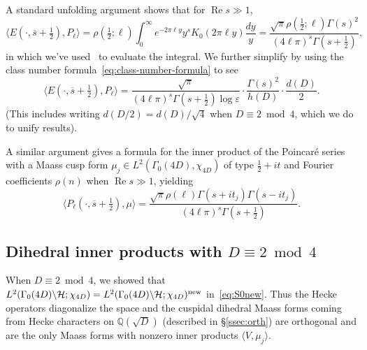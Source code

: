 \documentclass[11pt,reqno,oneside]{amsart}
\theoremstyle{plain}
\theoremstyle{definition}
\renewcommand{\Re}{\operatorname{Re}}
\newcommand{\chid}{\chi_{4D}}
\begin{document}
A standard unfolding argument shows that for $\Re s \gg 1$,
\begin{equation}\label{eq:E_Pell}
  \langle E(\cdot, \overline{s} + \tfrac{1}{2}), P_\ell \rangle
  =
  \rho(\tfrac{1}{2}; \ell)
  \int_0^\infty e^{-2 \pi \ell y}
  y^{s}
  K_{0}(2 \pi \ell y)
  \frac{dy}{y}
  =
  \frac{\sqrt{\pi} \rho(\tfrac{1}{2}; \ell)\Gamma(s)^2}{(4 \ell \pi)^s\Gamma(s
    + \tfrac{1}{2})},
\end{equation}
in which we've used~\cite[6.621(3)]{GradshteynRyzhik07} to evaluate the integral.
We further simplify by using the class number formula~\eqref{eq:class-number-formula}
to see
\begin{equation}\label{eq:inner_eis}
  \langle E(\cdot, \overline{s}+ \tfrac{1}{2}), P_\ell \rangle
  =
  \frac{\sqrt{\pi}}{(4 \ell \pi)^s \Gamma(s + \tfrac{1}{2}) \log \varepsilon}
  \cdot
  \frac{\Gamma(s)^2}{h(D)} \cdot \frac{d(D)}{2}.
\end{equation}
(This includes writing $d(D/2) = d(D) / \sqrt{4}$ when $D \equiv 2 \bmod 4$,
which we do to unify results).

A similar argument gives a formula for the inner product of the Poincar{\'e}
series with a Maass cusp form $\mu_j \in L^2(\Gamma_0(4D), \chid)$ of type
$\frac{1}{2} + it$ and Fourier coefficients $\rho(n)$ when $\Re s \gg 1$,
yielding
\begin{equation}\label{eq:poincare_inner}
  \langle P_\ell( \cdot, \overline{s} + \tfrac{1}{2}), \mu \rangle
  = \frac{\sqrt{\pi} \rho(\ell) \Gamma(s + it_j) \Gamma(s - it_j)}
  {(4 \ell \pi)^{s} \Gamma(s+\frac{1}{2})}.
\end{equation}


\subsection{Dihedral inner products with \texorpdfstring{$D \equiv 2 \bmod 4$}{D = 2 mod 4}}

When $D \equiv 2 \bmod 4$, we showed that $L^2(\Gamma_0(4D) \backslash
  \mathcal{H}; \chid) = L^2(\Gamma_0(4D) \backslash \mathcal{H} ;
  \chid)^{\textup{new}}$ in~\eqref{eq:S0new}.
Thus the Hecke operators diagonalize the space and the cuspidal dihedral Maass
forms coming from Hecke characters on $\mathbb{Q}(\sqrt{D})$ (described in
\S\ref{ssec:orth}) are orthogonal and are the only Maass forms with nonzero
inner products $\langle V, \mu_j \rangle$.
\end{document}

